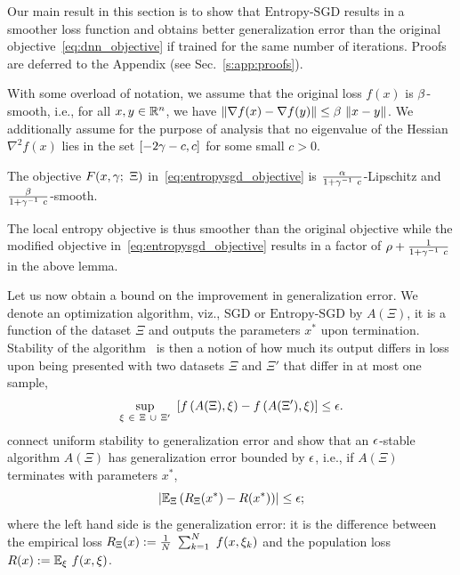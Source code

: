 \documentclass[10pt]{article}
\newcommand{\entropysgd}{\mathrm{Entropy}\textrm{-}\mathrm{SGD}}
\newcommand{\pc}[2]{{\color{ForestGreen}#1}\marginpar{\tiny\noindent{\raggedright{\color{Sienna}[PC]}\color{Sienna}{#2} \par}}}
\begin{document}
\pc{Our main result in this section is to show that $\entropysgd$ results in a smoother loss function and obtains better generalization error than the original objective~\eqref{eq:dnn_objective} if trained for the same number of iterations. Proofs are deferred to the Appendix (see Sec.~\ref{s:app:proofs}).}{Clarify that the analysis here is only a sketch, it is not rigorous}

With some overload of notation, we assume that the original loss $f(x)$ is $\beta$-smooth, i.e., for all $x,y \in \mathbb{R}^n$, we have $\norm{\nabla f(x) - \nabla f(y)} \leq \b\ \norm{x-y}$. We additionally assume for the purpose of analysis that no eigenvalue of the Hessian $\nabla^2 f(x)$ lies in the set $[-2 \gamma-c, c]$ for some small $c > 0$.
%
\begin{lemma}
\label{lem:smoothness_reduction}
The objective $F(x, \gamma;\ \Xi)$ in~\eqref{eq:entropysgd_objective} is $\frac{\alpha}{1 + \gamma^{-1}\ c}$-Lipschitz and $\f{\b}{1 + \g^{-1}\ c}$-smooth.
\end{lemma}
The local entropy objective is thus smoother than the original objective while the modified objective in~\eqref{eq:entropysgd_objective} results in a factor of $\rho + \frac{1}{1 + \gamma^{-1}\ c}$ in the above lemma.

Let us now obtain a bound on the improvement in generalization error. We denote an optimization algorithm, viz., SGD or $\entropysgd$ by $A(\Xi)$, it is a function of the dataset $\Xi$ and outputs the parameters $x^*$ upon termination. Stability of the algorithm~\citep{bousquet2002stability} is then a notion of how much its output differs in loss upon being presented with two datasets $\Xi$ and $\Xi'$ that differ in at most one sample,
$$
    \sup_{\xi\ \in\ \Xi\ \cup\ \Xi'}\ \left[ f \left(A(\Xi), \xi\right) - f \left(A(\Xi'), \xi\right)\right] \leq \epsilon.
$$
\citet{hardt2015train} connect uniform stability to generalization error and show that an $\epsilon$-stable algorithm $A(\Xi)$ has generalization error bounded by $\epsilon$, i.e., if $A(\Xi)$ terminates with parameters $x^*$,
$$
    \left|  \mathbb{E}_{\Xi} \left(R_\Xi(x^*) - R(x^*)\right)  \right| \leq \epsilon;
$$
where the left hand side is the generalization error: it is the difference between the empirical loss $R_\Xi(x) := \frac{1}{N}\ \sum_{k=1}^N\ f(x, \xi_k)$ and the population loss $R(x) := \mathbb{E}_{\xi}\ f(x, \xi)$.
\end{document}
